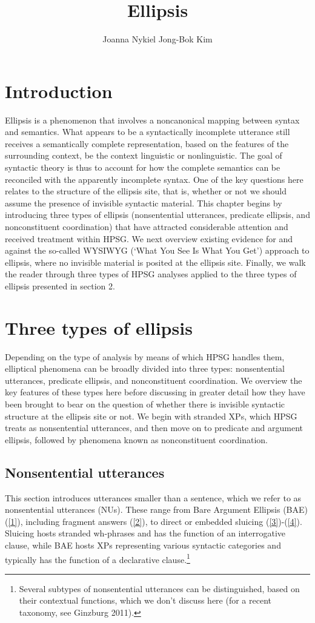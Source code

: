\documentclass[output=paper]{langsci/langscibook}
\author{%
	Joanna Nykiel\affiliation{Kyung Hee University, Seoul}%
	\lastand Jong-Bok Kim\affiliation{Kyung Hee University, Seoul}%
}
\title{Ellipsis}
\begin{document}
\label{chap-ellipsis}

{

\section{Introduction}
         Ellipsis is a phenomenon that involves a noncanonical mapping between syntax and semantics. What appears to be a syntactically incomplete utterance still receives a semantically complete representation, based on the features of the surrounding context, be the context linguistic or nonlinguistic. The goal of syntactic theory is thus to account for how the complete semantics can be reconciled with the apparently incomplete syntax. One of the key questions here relates to the structure of the ellipsis site, that is, whether or not we should assume the presence of invisible syntactic material. This chapter begins by introducing three types of ellipsis (nonsentential utterances, predicate ellipsis, and nonconstituent coordination) that have attracted considerable attention and received treatment within HPSG. We next overview existing evidence for and against the so-called WYSIWYG (`What You See Is What You Get') approach to ellipsis, where no invisible material is posited at the ellipsis site. Finally, we walk the reader through three types of HPSG analyses applied to the three types of ellipsis presented in section 2.


\section{Three types of ellipsis}
         Depending on the type of analysis by means of which HPSG handles them, elliptical phenomena can be broadly divided into three types:
         nonsentential utterances, predicate ellipsis, and nonconstituent coordination.
          We overview the key features of these types here before discussing in greater detail how they have been brought to bear on the question of whether there is invisible syntactic structure at the ellipsis site or not. We begin with stranded XPs, which HPSG treats as nonsentential utterances, and then move on to predicate and argument ellipsis, followed by phenomena known as nonconstituent coordination.

\subsection{Nonsentential utterances}
This section introduces utterances smaller than a sentence, which we refer to as nonsentential utterances (NUs). These range from Bare Argument Ellipsis (BAE) (\ref{1}), including fragment answers (\ref{2}), to direct or embedded sluicing (\ref{3})-(\ref{4}). Sluicing hosts stranded wh-phrases and has the function of an interrogative clause, while BAE hosts XPs representing various syntactic categories and typically has the function of a declarative clause.\footnote{Several subtypes of nonsentential utterances can be distinguished, based on their contextual functions, which we don't discuss here (for a recent taxonomy, see Ginzburg 2011).}



}
\end{document}
